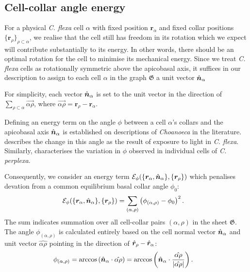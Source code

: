 \subsection{Cell-collar angle energy}
For a physical \textit{C. flexa} cell $\alpha$ with fixed position $\bm{r}_\alpha$ and fixed collar positions $\{\bm{r}_\rho\}_{\rho\subset\alpha}$, we realise that the cell still has freedom in its rotation which we expect will contribute substantially to its energy. 
In other words, there should be an optimal rotation for the cell to minimise its mechanical energy. 
Since we treat \textit{C. flexa} cells as rotationally symmetric above the apicobasal axis, it suffices in our description to assign to each cell $\alpha$ in the graph $\mathfrak{G}$ a unit vector $\hat{\bm{n}}_\alpha$ 

For simplicity, each vector $\hat{\bm{n}}_\alpha$ is set to the unit vector in the direction of $\sum_{\rho\subset\alpha} \vec{\alpha\rho}$, where $\vec{\alpha\rho} = \bm{r}_\rho - \bm{r}_\alpha$.

Defining an energy term on the angle $\phi$ between a cell $\alpha$'s collars and the apicobasal axis $\hat{\bm{n}}_\alpha$ is established on descriptions of \textit{Choanoeca} in the literature. 
\citet{brunet2019} describes the change in this angle as the result of exposure to light in \textit{C. flexa}.
Similarly, \citet{ellis1930} characterises the variation in $\phi$ observed in individual cells of \textit{C. perplexa}.

Consequently, we consider an energy term $\mathcal{E}_\phi(\{\bm{r}_\alpha, \hat{\bm{n}}_\alpha\}, \{\bm{r}_\rho\})$ which penalises devation from a common equilibrium basal collar angle $\phi_0$:
\begin{align}
	\mathcal{E}_\phi(\{\bm{r}_\alpha, \hat{\bm{n}}_\alpha\}, \{\bm{r}_\rho\}) &= \sum_{(\alpha, \rho)} \left(\phi_{(\alpha, \rho)} - \phi_0 \right)^2. \label{eq:e_phi}
\end{align}
\noindent The sum indicates summation over all cell-collar pairs $(\alpha, \rho)$ in the sheet $\mathfrak{G}$. The angle $\phi_{(\alpha, \rho)}$ is calculated entirely based on the cell normal vector $\hat{\bm{n}}_\alpha$ and unit vector $\hat{\alpha\rho}$ pointing in the direction of $\hat{\bm{r}}_\rho - \hat{\bm{r}}_\alpha$:
\begin{align}
	\phi_{(\alpha, \rho)} &= \arccos \left(\hat{\bm{n}}_\alpha \cdot \hat{\alpha\rho} \right) = \arccos \left(\hat{\bm{n}}_\alpha \cdot \frac{\hat{\alpha\rho}}{\left| \hat{\alpha\rho}\right|} \right). \label{eq:phi}
\end{align}

